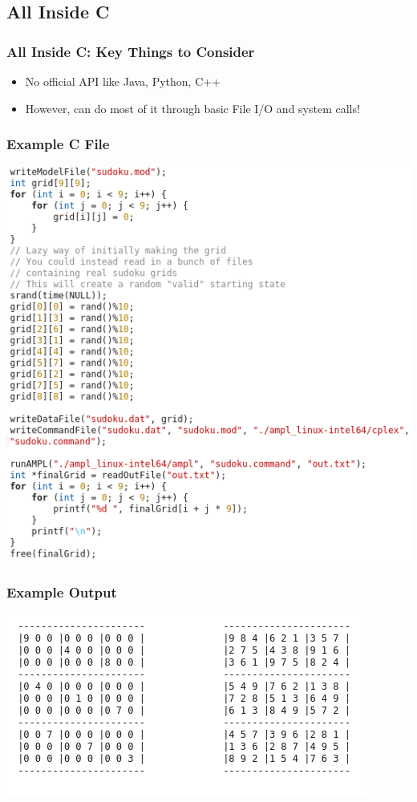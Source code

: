 \documentclass{beamer}
\begin{document}
    \subsection{All Inside C}
    \begin{frame}
        \frametitle{All Inside C: Key Things to Consider}
        \begin{itemize}
            \item No official API like Java, Python, C++
            \item However, can do most of it through basic File I/O and system calls!
        \end{itemize}
    \end{frame}
    \begin{frame}
        \frametitle{Example C File}
        \centering
        \includegraphics[scale=.35]{figures/insideCCode.png}
    \end{frame}
    \begin{frame}
        \frametitle{Example Output}
        \centering
        \includegraphics[width=.75\textwidth]{figures/randomInOut.png}
    \end{frame}
\end{document}
